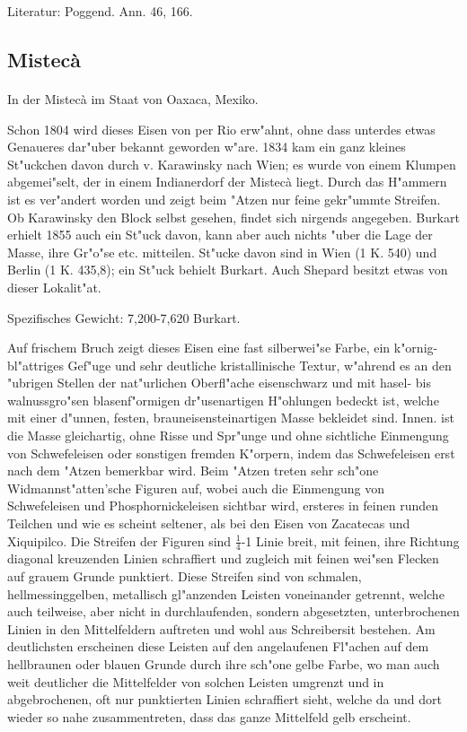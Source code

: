 \documentclass[a4paper, 11pt, oneside]{article}
\begin{document}
\footnotesize
Literatur: Poggend. Ann. 46, 166.

\subsection{Mistecà}
\normalsize
\paragraph{}
In der Mistecà im Staat von Oaxaca, Mexiko.

Schon 1804 wird dieses Eisen von per Rio erw"ahnt, ohne dass unterdes etwas Genaueres dar"uber bekannt geworden w"are. 1834 kam ein ganz kleines St"uckchen davon durch v. Karawinsky nach Wien; es wurde von einem Klumpen abgemei"selt, der in einem Indianerdorf der Mistecà liegt. Durch das H"ammern ist es ver"andert worden und zeigt beim "Atzen nur feine gekr"ummte Streifen. Ob Karawinsky den Block selbst gesehen, findet sich nirgends angegeben. Burkart erhielt 1855 auch ein St"uck davon, kann aber auch nichts "uber die Lage der Masse, ihre Gr"o"se etc. mitteilen. St"ucke davon sind in Wien (1 K. 540) und Berlin (1 K. 435,8); ein St"uck behielt Burkart. Auch Shepard besitzt etwas von dieser Lokalit"at.

Spezifisches Gewicht: 7,200-7,620 Burkart.

Auf frischem Bruch zeigt dieses Eisen eine fast silberwei"se Farbe, ein k"ornig-bl"attriges Gef"uge und sehr deutliche kristallinische Textur, w"ahrend es an den "ubrigen Stellen der nat"urlichen Oberfl"ache eisenschwarz und mit hasel- bis walnussgro"sen blasenf"ormigen dr"usenartigen H"ohlungen bedeckt ist, welche mit einer d"unnen, festen, brauneisensteinartigen Masse bekleidet sind. Innen. ist die Masse gleichartig, ohne Risse und Spr"unge und ohne sichtliche Einmengung von Schwefeleisen oder sonstigen fremden K"orpern, indem das Schwefeleisen erst nach dem "Atzen bemerkbar wird. Beim "Atzen treten sehr sch"one Widmannst"atten'sche Figuren auf, wobei auch die Einmengung von Schwefeleisen und Phosphornickeleisen sichtbar wird, ersteres in feinen runden Teilchen und wie es scheint seltener, als bei den Eisen von Zacatecas und Xiquipilco. Die Streifen der Figuren sind $\frac{1}{4}$-1 Linie breit, mit feinen, ihre Richtung diagonal kreuzenden Linien schraffiert und zugleich mit feinen wei"sen Flecken auf grauem Grunde punktiert. Diese Streifen sind von schmalen, hellmessinggelben, metallisch gl"anzenden Leisten voneinander getrennt, welche auch teilweise, aber nicht in durchlaufenden, sondern abgesetzten, unterbrochenen Linien in den Mittelfeldern auftreten und wohl aus Schreibersit bestehen. Am deutlichsten erscheinen diese Leisten auf den angelaufenen Fl"achen auf dem hellbraunen oder blauen Grunde durch ihre sch"one gelbe Farbe, wo man auch weit deutlicher die Mittelfelder von solchen Leisten umgrenzt und in abgebrochenen, oft nur punktierten Linien schraffiert sieht, welche da und dort wieder so nahe zusammentreten, dass das ganze Mittelfeld gelb erscheint.
\end{document}
